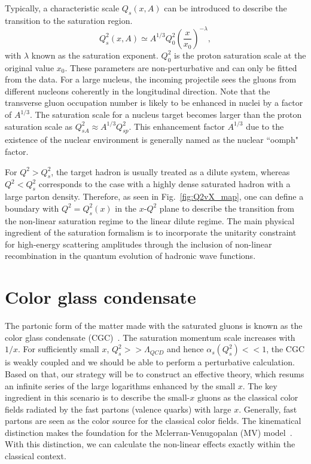 Typically, a characteristic scale $Q_{s}(x,A)$ can
be introduced to describe the transition to the saturation region. 
\begin{equation}
Q^{2}_{s}(x,A)\simeq A^{1/3} Q^{2}_{0}(\frac{x}{x_{0}})^{-\lambda},
\label{eqn:sat_scale}
\end{equation}
with $\lambda$ known as the saturation exponent. $Q^{2}_{0}$ is the proton
saturation scale at the original value $x_{0}$. These parameters are
non-perturbative and can only be fitted from the data. 
For a large nucleus, the incoming projectile sees the gluons from different nucleons coherently in the longitudinal direction. Note that the transverse gluon occupation number is likely to be enhanced in nuclei by a factor of $A^{1/3}$.
The saturation scale for a nucleus target becomes larger than the proton saturation scale as
$Q_{sA}^{2}\approx A^{1/3}Q^{2}_{sp}$. This enhancement factor $A^{1/3}$ due to
the existence of the nuclear environment is generally named as the nuclear
``oomph" factor.

For $Q^{2}>Q_{s}^{2}$, the target hadron is usually treated as a dilute system,
whereas $Q^{2}<Q_{s}^{2}$ corresponds to the case with a highly dense saturated
hadron with a large parton density. Therefore, as seen in
Fig.~\ref{fig:Q2vX_map}, one can define a boundary with $Q^2=Q_s^2(x)$ in the
$x\textrm{-}Q^2$ plane to describe the transition from the non-linear saturation
regime to the linear dilute regime. The main physical ingredient of the
saturation formalism is to incorporate the unitarity constraint for high-energy
scattering amplitudes through the inclusion of non-linear recombination in the
quantum evolution of hadronic wave functions.


\section{Color glass condensate}\label{sec:CGC}
The partonic form of the matter made with the saturated gluons is known as the
color glass condensate (CGC)~\cite{Iancu:2002xk}. The saturation momentum scale
increases with $1/x$. For sufficiently small $x$, $Q^{2}_{s}>>\Lambda_{QCD}$ and
hence $\alpha_{s}(Q^{2}_{s})<<1$, the CGC is weakly coupled and we should be
able to perform a perturbative calculation. Based on that, our strategy will be
to construct an effective theory, which resums an infinite series of the large
logarithms enhanced by the small $x$. The key ingredient in this scenario is to
describe the small-$x$ gluons as the classical color fields radiated by the fast
partons (valence quarks) with large $x$. Generally, fast partons are seen as the
color source for the classical color fields. The kinematical distinction makes
the foundation for the Mclerran-Venugopalan (MV) model~\cite{McLerran:1993ni}.
With this distinction, we can calculate the non-linear effects exactly within
the classical context.

